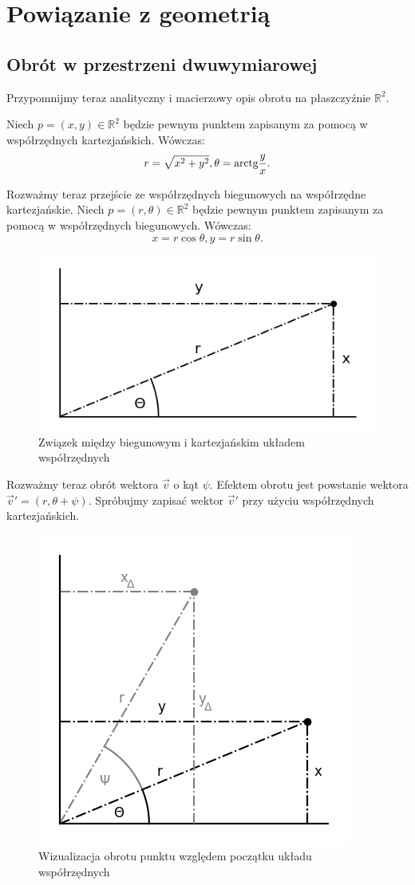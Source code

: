 \documentclass[a4paper,twoside,11pt,reqno]{mwrep}
\theoremstyle{plain} \newtheorem{twr}{Twierdzenie}
\theoremstyle{plain} \newtheorem{lem}{Lemat}
\theoremstyle{definition} \newtheorem{defi}{Definicja}
\theoremstyle{remark} \newtheorem*{wni}{Wniosek}
\theoremstyle{definition} \newtheorem{uwaga}{Uwaga}
\theoremstyle{definition}\newtheorem{prz}{Przykład}
\begin{document}
\chapter{Powiązanie z geometrią}


\section{Obrót w przestrzeni dwuwymiarowej}\label{obrot2drozdzial}
Przypomnijmy teraz analityczny i macierzowy opis obrotu na płaszczyźnie 
$\mathbb{R}^2$. 

Niech $p=(x,y)\in\mathbb{R}^2$ będzie pewnym punktem zapisanym za pomocą w 
współrzędnych kartezjańskich. Wówczas:
$$r = \sqrt{x^2+y^2},\theta=\textup{arctg}\frac{y}{x}.$$

Rozważmy teraz przejście ze współrzędnych biegunowych na
współrzędne kartezjańskie.
Niech $p=(r,\theta)\in\mathbb{R}^2$ będzie pewnym punktem zapisanym za pomocą w 
współrzędnych biegunowych. Wówczas:
$$x=r\cos\theta,y=r\sin\theta.$$ 

\begin{figure}[h]
\begin{center}
\includegraphics[width=6 cm]{wizualizacja.png}
\caption{Związek między biegunowym i kartezjańskim układem współrzędnych}
\end{center}
\end{figure}



Rozważmy teraz obrót wektora $\overrightarrow{v}$ o kąt $\psi$. Efektem obrotu jest powstanie wektora
$\overrightarrow{v}'=(r,\theta+\psi)$. Spróbujmy zapisać wektor $\overrightarrow{v}'$
przy użyciu współrzędnych kartezjańskich.

\begin{figure}[h]
\begin{center}
\includegraphics[width=6 cm]{wizualizacjaobrotu.png}
\caption{Wizualizacja obrotu punktu względem początku układu współrzędnych}
\end{center}
\end{figure}
\end{document}
